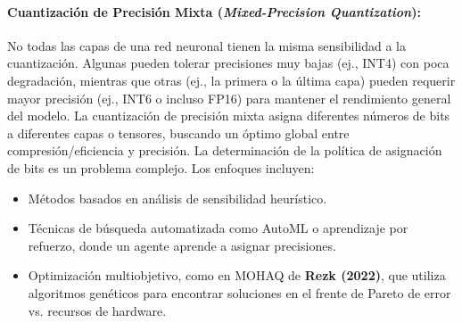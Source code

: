 \documentclass[12pt]{article}
\begin{document}
\paragraph{Cuantización de Precisión Mixta (\textit{Mixed-Precision Quantization}):}
No todas las capas de una red neuronal tienen la misma sensibilidad a la cuantización. Algunas pueden tolerar precisiones muy bajas (ej., INT4) con poca degradación, mientras que otras (ej., la primera o la última capa) pueden requerir mayor precisión (ej., INT6 o incluso FP16) para mantener el rendimiento general del modelo. La cuantización de precisión mixta asigna diferentes números de bits a diferentes capas o tensores, buscando un óptimo global entre compresión/eficiencia y precisión.
La determinación de la política de asignación de bits es un problema complejo. Los enfoques incluyen:
\begin{itemize}
    \item Métodos basados en análisis de sensibilidad heurístico.
    \item Técnicas de búsqueda automatizada como AutoML o aprendizaje por refuerzo, donde un agente aprende a asignar precisiones.
    \item Optimización multiobjetivo, como en MOHAQ de \textbf{Rezk (2022)}\cite{Rezk2022MOHAQ}, que utiliza algoritmos genéticos para encontrar soluciones en el frente de Pareto de error vs. recursos de hardware.
\end{itemize}
\end{document}
